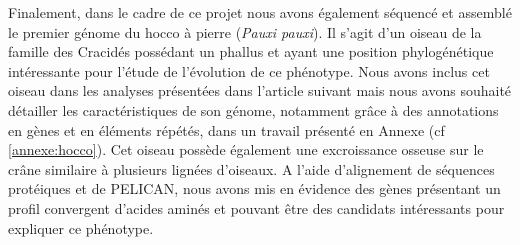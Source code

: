 Finalement, dans le cadre de ce projet nous avons également séquencé et assemblé le premier génome du hocco à pierre (\textit{Pauxi pauxi}). Il s’agit d’un oiseau de la famille des Cracidés possédant un phallus et ayant une position phylogénétique intéressante pour l’étude de l’évolution de ce phénotype. Nous avons inclus cet oiseau dans les analyses présentées dans l’article suivant mais nous avons souhaité détailler les caractéristiques de son génome, notamment grâce à des annotations en gènes et en éléments répétés, dans un travail présenté en Annexe (cf \ref{annexe:hocco}). Cet oiseau possède également une excroissance osseuse sur le crâne similaire à plusieurs lignées d’oiseaux. A l’aide d’alignement de séquences protéiques et de PELICAN, nous avons mis en évidence des gènes présentant un profil convergent d’acides aminés et pouvant être des candidats intéressants pour expliquer ce phénotype.
